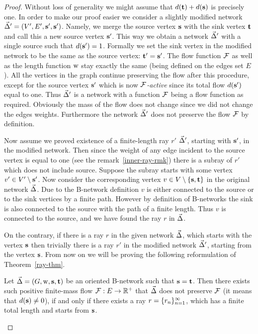 \documentclass[12pt]{amsart}
\begin{document}
    \begin{proof}
      Without loss of generality we might assume that $d(\mathbf{t}) + d(\mathbf{s})$ is precisely one.
      In order to make our proof easier we consider a slightly modified network $\vec{\Delta}' = (V', E', \mathbf{s}', \mathbf{s}')$.
      Namely, we merge the source vertex $\mathbf{s}$ with the sink vertex $\mathbf{t}$ and call this a
        new source vertex $\mathbf{s}'$.
      This way we obtain a network $\vec{\Delta}'$ with a single source such that $d(\mathbf{s}') = 1$.
      Formally we set the sink vertex in the modified network to be the same as the source vertex: $\mathbf{t}'=\mathbf{s}'$.
      The flow function $\mathcal{F}$ as well as the length function $\mathrm{w}$ stay exactly the same (being defined on the edges set $E$).
      All the vertices in the graph continue preserving the flow after this procedure, except for the source vertex $\mathbf{s}'$
        which is now \emph{$\mathcal{F}$-active} since its total flow $d(\mathbf{s}')$ equal to one.
      Thus $\vec{\Delta}'$ is a network with a function $\mathcal{F}$ being a flow function as required.
      Obviously the mass of the flow does not change since we did not change the edges weights.
      Furthermore the network $\vec{\Delta}'$ does not preserve the flow $\mathcal{F}$ by definition.

      Now assume we proved existence of a finite-length ray $r'$ $\vec{\Delta}'$, starting with $\mathbf{s}'$, in the modified network.
      Then since the weight of any edge incident to the source vertex is equal to one (see the remark~\ref{inner-ray-rmk})
        there is a subray of $r'$ which does not include source.
      Suppose the subray starts with some vertex $v' \in V' \setminus \mathbf{s}'$.
      Now consider the corresponding vertex $v \in V \setminus \left\{\mathbf{s}, \mathbf{t}\right\}$ in the original network $\vec{\Delta}$.
      Due to the B-network definition $v$ is either connected to the source or to the sink vertices by a finite path.
      However by  definition of B-networks the sink is also connected to the source with the path of a finite length.
      Thus $v$ is connected to the source, and we have found the ray $r$ in $\vec{\Delta}$.

      On the contrary, if there is a ray $r$ in the given network $\vec{\Delta}$, which starts with the vertex $\mathbf{s}$
        then trivially there is a ray $r'$ in the modified network $\vec{\Delta}'$, starting from the vertex $\mathbf{s}$.
      From now on we will be proving the following reformulation of Theorem~\ref{ray-thm}.
      \begin{theorem*}
        Let $\vec{\Delta} = (G, \mathrm{w}, \mathbf{s}, \mathbf{t})$ be an oriented B-network such that $\mathbf{s} = \mathbf{t}$.
        Then there exists such positive finite-mass flow $\mathcal{F}: E \to \mathbb{R}^{+}$ that
          $\vec{\Delta}$ does not preserve $\mathcal{F}$ (it means that $d(\mathbf{s}) \neq 0$),
          if and only if there exists a ray $r = \{{r}_n\}_{n=1}^\infty$, which has a finite total length and starts from $\mathbf{s}$.
      \end{theorem*}

\end{proof}
\end{document}
